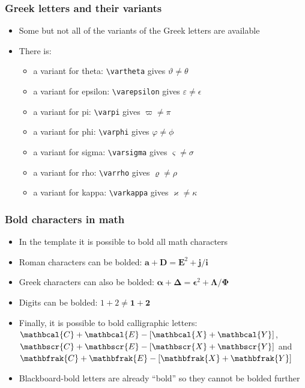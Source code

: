 \expandafter\documentclass\expandafter[\presentationclassoptions]{beamer}
\begin{document}
\begin{frame}
  \frametitle{Greek letters and their variants}
  \begin{itemize}
    \item Some \textcolor{GitHubBlue}{but not all} of the variants of the Greek letters are available
    \item There is:
      \begin{itemize}
        \item a variant for theta: \texttt{\textbackslash vartheta} gives $\vartheta \neq \theta$
        \item a variant for epsilon: \texttt{\textbackslash varepsilon} gives $\varepsilon \neq \epsilon$
        \item a variant for pi: \texttt{\textbackslash varpi} gives $\varpi \neq \pi$
        \item a variant for phi: \texttt{\textbackslash varphi} gives $\varphi \neq \phi$
        \item a variant for sigma: \texttt{\textbackslash varsigma} gives $\varsigma \neq \sigma$
        \item a variant for rho: \texttt{\textbackslash varrho} gives $\varrho \neq \rho$
        \item a variant for kappa: \texttt{\textbackslash varkappa} gives $\varkappa \neq \kappa$
      \end{itemize}
  \end{itemize}
\end{frame}

\begin{frame}
  \frametitle{Bold characters in math}
  \begin{itemize}
    \item In the template it is possible to bold all math characters
    \item Roman characters can be bolded: $\bm{a} + \bm{D} = \bm{E}^2 + \bm{j}/\bm{i}$
    \item Greek characters can also be bolded: $\bm{\alpha} + \bm{\Delta} = \bm{\epsilon}^2 + \bm{\Lambda}/\bm{\Phi}$
    \item Digits can be bolded: $1 + 2 \neq \bm{1} + \bm{2}$
    \item Finally, it is possible to bold calligraphic letters: $\mathbcal{C} + \mathbcal{E} - [\mathbcal{X}+\mathbcal{Y}]$, $\mathbscr{C} + \mathbscr{E} - [\mathbscr{X}+\mathbscr{Y}]$ and $\mathbfrak{C} + \mathbfrak{E} - [\mathbfrak{X}+\mathbfrak{Y}]$
    \item \textcolor<2>{GitHubBlue}{Blackboard-bold letters are already ``bold'' so they cannot be bolded further}
  \end{itemize}
\end{frame}
\end{document}
